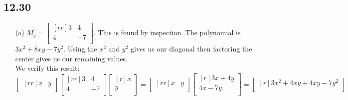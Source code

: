 \documentclass{report}
\begin{document}
\subsection{12.30}
\begin{enumerate}
\item[(a)] $M_q=\begin{bmatrix}[rr]3&4\\4&-7\\\end{bmatrix}$. This is found by inspection. The polynomial is $3x^2+8xy-7y^2$. Using the $x^2$ and $y^2$ gives us our diagonal then factoring the center gives us our remaining values.\\
We verify this result:
\[ \begin{bmatrix}[rr]x&y\\\end{bmatrix}\begin{bmatrix}[rr]3&4\\4&-7\\\end{bmatrix}\begin{bmatrix}[r]x\\y\\\end{bmatrix} = \begin{bmatrix}[rr]x&y\\\end{bmatrix}\begin{bmatrix}[r]3x+4y\\4x-7y\\\end{bmatrix} = \begin{bmatrix}[r]3x^2+4xy+4xy-7y^2\\\end{bmatrix} \]
\end{enumerate}
\end{document}
